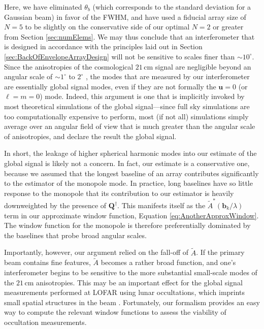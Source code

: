 \documentclass[twocolumn,apj,numberedappendix]{emulateapj}
\newcommand{\acl}[1]{}
\begin{document}
Here, we have eliminated $\theta_b$ (which corresponds to the standard deviation for a Gaussian beam) in favor of the FWHM, and have used a fiducial array size of $N=5$ to be slightly on the conservative side of our optimal $N=2$ or greater from Section \ref{sec:numElems}. We may thus conclude that an interferometer that is designed in accordance with the principles laid out in Section \ref{sec:BackOfEnvelopeArrayDesign} will not be sensitive to scales finer than $\sim 10^\circ$. Since the anisotropies of the cosmological $21\,\textrm{cm}$ signal are negligible beyond an angular scale of $\sim 1^\circ$ to $2^\circ$ \citep{BittnerLoeb2011}, the modes that are measured by our interferometer are essentially global signal modes, even if they are not formally the $\mathbf{u} = 0$ (or $\ell = m = 0$) mode. Indeed, this argument is one that is implicitly invoked by most theoretical simulations of the global signal---since full sky simulations are too computationally expensive to perform, most (if not all) simulations simply average over an angular field of view that is much greater than the angular scale of anisotropies, and declare the result the global signal.

In short, the leakage of higher spherical harmonic modes into our estimate of the global signal is likely not a concern. In fact, our estimate is a conservative one, because we assumed that the longest baseline of an array contributes significantly to the estimator of the monopole mode. In practice, long baselines have so little response to the monopole that its contribution to our estimator is heavily downweighted by the presence of $\mathbf{Q}^\dagger$. This manifests itself as the $\widetilde{A}^* ( \mathbf{b}_k / \lambda )$ term in our approximate window function, Equation \eqref{eq:AnotherApproxWindow}. The window function for the monopole is therefore preferentially dominated by the baselines that probe broad angular scales.

Importantly, however, our argument relied on the fall-off of $\widetilde{A}$. If the primary beam contains fine features, $\widetilde{A}$ becomes a rather broad function, and one's interferometer begins to be sensitive to the more substantial small-scale modes of the $21\,\textrm{cm}$ anisotropies. This may be an important effect for the global signal measurements performed at LOFAR using lunar occultations, which imprints small spatial structures in the beam \citep{VedanthamLOFAR2}. Fortunately, our formalism provides an easy way to compute the relevant window functions to assess the viability of occultation measurements.
\end{document}
